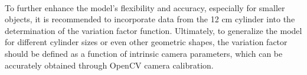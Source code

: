\paragraph*{}
To further enhance the model's flexibility and accuracy, especially for smaller objects, it is recommended to incorporate data from the 12 cm cylinder into the determination of the variation factor function. Ultimately, to generalize the model for different cylinder sizes or even other geometric shapes, the variation factor should be defined as a function of intrinsic camera parameters, which can be accurately obtained through OpenCV camera calibration.
